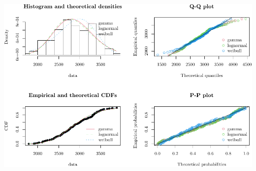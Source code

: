 \documentclass[
  11pt,
]{article}
\begin{document}
\includegraphics{code_fallacies_water_crisis_files/figure-latex/all_model-1.pdf}
\end{document}
